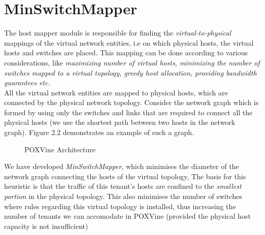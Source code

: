 \section{MinSwitchMapper}
The host mapper module is responsible for finding the \emph{virtual-to-physical} mappings of the virtual network entities, i.e on which physical hosts, the virtual hosts and switches are placed. This mapping can be done according to various considerations, like \emph{maximizing number of virtual hosts, minimizing the number of switches mapped to a virtual topology, greedy host allocation, providing bandwidth guarantees etc.} \\

All the virtual network entities are mapped to physical hosts, which are connected by the physical network topology. Consider the network graph which is formed by using only the switches and links that are required to connect all the physical hosts (we use the shortest path between two hosts in the network graph). Figure 2.2 demonstrates an example of such a graph. \\
\begin{figure}
	\noindent
	\caption{POXVine Architecture}
\end{figure}

We have developed \emph{MinSwitchMapper}, which minimises the diameter of the network graph connecting the hosts of the virtual topology, The basis for this heuristic is that the traffic of this tenant's hosts are confined to the \emph{smallest portion} in the physical topology. This also minimises the number of switches where rules regarding this virtual topology is installed, thus increasing the number of tenants we can accomodate in POXVine (provided the physical host capacity is not insufficient)

